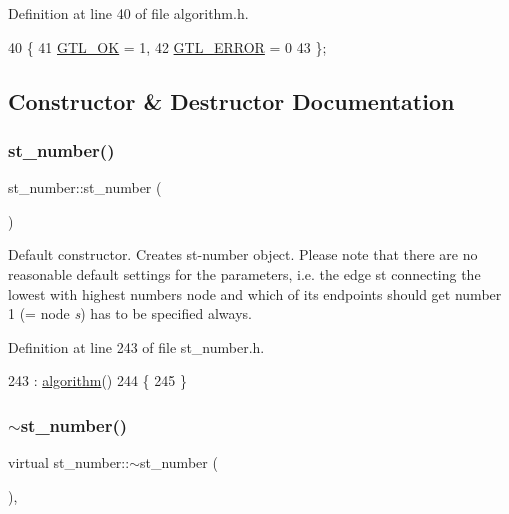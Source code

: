 Definition at line 40 of file algorithm.\+h.


\begin{DoxyCode}
40          \{
41     \mbox{\hyperlink{classalgorithm_af1a0078e153aa99c24f9bdf0d97f6710a5114c20e4a96a76b5de9f28bf15e282b}{GTL\_OK}} = 1,
42     \mbox{\hyperlink{classalgorithm_af1a0078e153aa99c24f9bdf0d97f6710a6fcf574690bbd6cf710837a169510dd7}{GTL\_ERROR}} = 0
43     \};
\end{DoxyCode}


\subsection{Constructor \& Destructor Documentation}
\mbox{\label{classst__number_a07532323fbcc643dfc419809385b64a7}} 
\subsubsection{\texorpdfstring{st\+\_\+number()}{st\_number()}}
{\footnotesize\ttfamily st\+\_\+number\+::st\+\_\+number (\begin{DoxyParamCaption}{ }\end{DoxyParamCaption})\hspace{0.3cm}{\ttfamily [inline]}}



Default constructor. Creates st-\/number object. Please note that there are no reasonable default settings for the parameters, i.\+e. the edge  st connecting the lowest with highest numbers node and which of its endpoints should get number 1 (= node {\itshape s}) has to be specified always. 



Definition at line 243 of file st\+\_\+number.\+h.


\begin{DoxyCode}
243                 : \mbox{\hyperlink{classalgorithm_ab79e1ddec2f2afdf4b36b10724db8b15}{algorithm}}()
244     \{
245     \}
\end{DoxyCode}
\mbox{\label{classst__number_a4f3a2a6ceab39d106c920ee3546c259d}} 
\subsubsection{\texorpdfstring{$\sim$st\+\_\+number()}{~st\_number()}}
{\footnotesize\ttfamily virtual st\+\_\+number\+::$\sim$st\+\_\+number (\begin{DoxyParamCaption}{ }\end{DoxyParamCaption})\hspace{0.3cm}{\ttfamily [inline]}, {\ttfamily [virtual]}}



